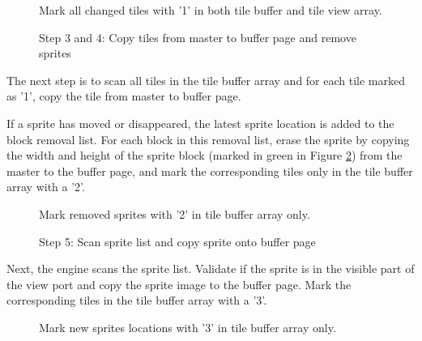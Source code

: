 \documentclass[book.tex]{subfiles}
\begin{document}
\begin{figure}[H]
\centering
 \caption{Mark all changed tiles with '1' in both tile buffer and tile view array.}
 \label{fig:kc1_3_update_refresh_img_1}
\end{figure}


\pagebreak

\begin{figure}[H]
\centering
 \caption{Step 3 and 4: Copy tiles from master to buffer page and remove sprites}
 \label{fig:kc1_3_update_remove}
\end{figure}

The next step is to scan all tiles in the tile buffer array and for each tile marked as '1', copy the tile from master to buffer page.\\
\par
If a sprite has moved or disappeared, the latest sprite location is added to the block removal list. For each block in this removal list, erase the sprite by copying the width and height of the sprite block (marked in green in Figure \ref{fig:kc1_3_update_remove}) from the master to the buffer page, and mark the corresponding tiles only in the tile buffer array with a '2'.

\begin{figure}[H]
\centering
 \caption{Mark removed sprites with '2' in tile buffer array only.}
 \label{fig:kc1_3_tile_update_remove}
\end{figure}


\pagebreak

\begin{figure}[H]
\centering
 \caption{Step 5: Scan sprite list and copy sprite onto buffer page}
 \label{fig:kc1_3_update_sprite}
\end{figure}

Next, the engine scans the sprite list. Validate if the sprite is in the visible part of the view port and copy the sprite image to the buffer page. Mark the corresponding tiles in the tile buffer array with a '3'.

\begin{figure}[H]
\centering
 \caption{Mark new sprites locations with '3' in tile buffer array only.}
 \label{fig:kc1_3_tile_update_sprite}
\end{figure}
\end{document}
